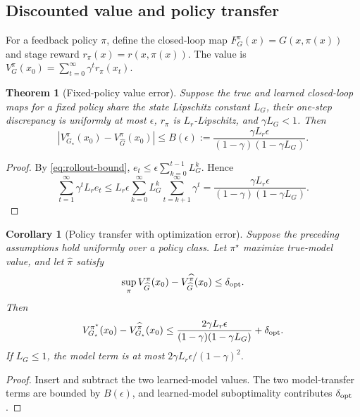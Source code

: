 \documentclass[10pt]{article}
\newtheorem{theorem}{Theorem}
\newtheorem{corollary}{Corollary}
\begin{document}
\subsection{Discounted value and policy transfer}

For a feedback policy $\pi$, define the closed-loop map
$F_G^\pi(x)=G(x,\pi(x))$ and stage reward
$r_\pi(x)=r(x,\pi(x))$. The value is
$V_G^\pi(x_0)=\sum_{t=0}^{\infty}\gamma^t r_\pi(x_t)$.

\begin{theorem}[Fixed-policy value error]
Suppose the true and learned closed-loop maps for a fixed policy share the
state Lipschitz constant $L_G$, their one-step discrepancy is uniformly at
most $\epsilon$, $r_\pi$ is $L_r$-Lipschitz, and $\gamma L_G<1$. Then
\begin{equation}
\left|V_{G_\star}^{\pi}(x_0)-V_{\widehat G}^{\pi}(x_0)\right|
\le
B(\epsilon):=
\frac{\gamma L_r\epsilon}
{(1-\gamma)(1-\gamma L_G)}.
\label{eq:fixed-policy-bound}
\end{equation}
\end{theorem}
\begin{proof}
By \cref{eq:rollout-bound},
$e_t\le\epsilon\sum_{k=0}^{t-1}L_G^k$. Hence
\[
\sum_{t=1}^{\infty}\gamma^t L_re_t
\le L_r\epsilon
\sum_{k=0}^{\infty}L_G^k\sum_{t=k+1}^{\infty}\gamma^t
=\frac{\gamma L_r\epsilon}
{(1-\gamma)(1-\gamma L_G)}.
\]
\end{proof}

\begin{corollary}[Policy transfer with optimization error]
Suppose the preceding assumptions hold uniformly over a policy class. Let
$\pi^\star$ maximize true-model value, and let $\widehat\pi$ satisfy
\begin{equation}
\sup_\pi V_{\widehat G}^{\pi}(x_0)
-V_{\widehat G}^{\widehat\pi}(x_0)\le\delta_{\rm opt}.
\end{equation}
Then
\begin{equation}
V_{G_\star}^{\pi^\star}(x_0)-V_{G_\star}^{\widehat\pi}(x_0)
\le
\frac{2\gamma L_r\epsilon}
{(1-\gamma)(1-\gamma L_G)}+\delta_{\rm opt}.
\label{eq:policy-transfer}
\end{equation}
If $L_G\le1$, the model term is at most
$2\gamma L_r\epsilon/(1-\gamma)^2$.
\end{corollary}
\begin{proof}
Insert and subtract the two learned-model values. The two model-transfer terms
are bounded by $B(\epsilon)$, and learned-model suboptimality contributes
$\delta_{\rm opt}$.
\end{proof}
\end{document}
